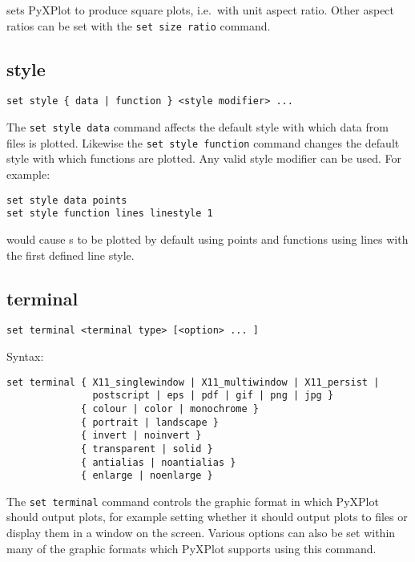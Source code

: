 \noindent sets PyXPlot to produce square plots, i.e.\ with unit aspect ratio. Other aspect
ratios can be set with the {\tt set size ratio} command.

\subsection{style}

\begin{verbatim}
set style { data | function } <style modifier> ...
\end{verbatim}

The {\tt set style data} command affects the default style with which data from
files is plotted.  Likewise the {\tt set style function} command changes the
default style with which functions are plotted.  Any valid style modifier can
be used.  For example:

\begin{verbatim}
set style data points
set style function lines linestyle 1
\end{verbatim}

\noindent would cause \datafile s to be plotted by default using points and
functions using lines with the first defined line style.
 
\subsection{terminal}

\begin{verbatim}
set terminal <terminal type> [<option> ... ]
\end{verbatim}

Syntax:

\begin{verbatim}
set terminal { X11_singlewindow | X11_multiwindow | X11_persist | 
               postscript | eps | pdf | gif | png | jpg } 
             { colour | color | monochrome } 
             { portrait | landscape } 
             { invert | noinvert } 
             { transparent | solid }
             { antialias | noantialias }
             { enlarge | noenlarge }
\end{verbatim}

The {\tt set terminal} command controls the graphic format in which PyXPlot
should output plots, for example setting whether it should output plots to files
or display them in a window on the screen. Various options can also be set
within many of the graphic formats which PyXPlot supports using this command.

